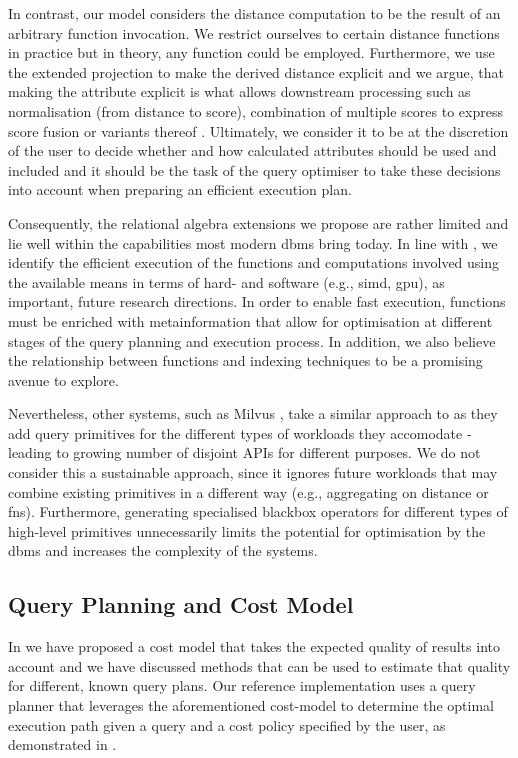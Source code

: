 In contrast, our model considers the distance computation to be the result of an arbitrary function invocation. We restrict ourselves to certain distance functions in practice but in theory, any function could be employed. Furthermore, we use the extended projection to make the derived distance explicit and we argue, that making the attribute explicit is what allows downstream processing such as normalisation (from distance to score), combination of multiple scores to express score fusion or variants thereof \cite{Bohm:2001Fast}. Ultimately, we consider it to be at the discretion of the user to decide whether and how calculated attributes should be used and included and it should be the task of the query optimiser to take these decisions into account when preparing an efficient execution plan.

Consequently, the relational algebra extensions we propose are rather limited and lie well within the capabilities most modern \acrshort{dbms} bring today. In line with \cite{Abadi:2014Beckman,Abadi:2020Seattle}, we identify the efficient execution of the functions and computations involved using the available means in terms of hard- and software (e.g., \acrshort{simd}, \acrshort{gpu}), as important, future research directions. In order to enable fast execution, functions must be enriched with metainformation that allow for optimisation at different stages of the query planning and execution process. In addition, we also believe the relationship between functions and indexing techniques to be a promising avenue to explore. 

Nevertheless, other systems, such as Milvus \cite{Wang:2021Milvus}, take a similar approach to \cite{Giangreco:2016Adam} as they add query primitives for the different types of workloads they accomodate - leading to growing number of disjoint APIs for different purposes. We do not consider this a sustainable approach, since it ignores future workloads that may combine existing primitives in a different way (e.g., aggregating on distance or \acrshort{fns}). Furthermore, generating specialised blackbox operators for different types of high-level primitives unnecessarily limits the potential for optimisation by the \acrshort{dbms} and increases the complexity of the systems. 

\subsection{Query Planning and Cost Model}  
In  we have proposed a cost model that takes the expected quality of results into account and we have discussed methods that can be used to estimate that quality for different, known query plans. Our reference implementation \cottontail{} uses a query planner that leverages the aforementioned cost-model to determine the optimal execution path given a query and a cost policy specified by the user, as demonstrated in .

